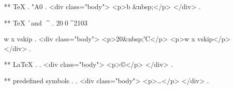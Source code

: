 ** TeX \char
.
 \char"A0
.
<div class="body">
<p>b &nbsp;</p>
</div>
.

** TeX ^^ and ^^^^
.
20^^A0^^^^2103

^^7 ^^78 vs^^+ip
.
<div class="body">
<p>20&nbsp;℃</p>
<p>w x vskip</p>
</div>
.


** LaTeX \symbol{}
.
.
<div class="body">
<p>©</p>
</div>
.


** predefined symbols
.
\textellipsis
.
<div class="body">
<p>…</p>
</div>
.